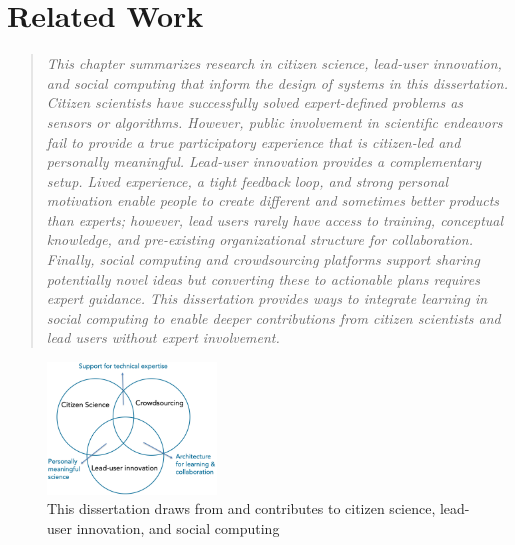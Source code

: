 \chapter{Related Work}
\begin{quote}
\emph{This chapter summarizes research in citizen science, lead-user innovation, and social computing that inform the design of systems in this dissertation. Citizen scientists have successfully solved expert-defined problems as sensors or algorithms. However, public involvement in scientific endeavors fail to provide a true participatory experience that is citizen-led and personally meaningful. Lead-user innovation provides a complementary setup. Lived experience, a tight feedback loop, and strong personal motivation enable people to create different and sometimes better products than experts; however, lead users rarely have access to training, conceptual knowledge, and pre-existing organizational structure for collaboration. Finally, social computing and crowdsourcing platforms support sharing potentially novel ideas but converting these to actionable plans requires expert guidance. This dissertation provides ways to integrate learning in social computing to enable deeper contributions from citizen scientists and lead users without expert involvement.} 
\end{quote}


\begin{figure}[h] 
  \centering
  \includegraphics[width=0.4\textwidth]{figures/2-related/venn.png}
  \caption[]
{This dissertation draws from and contributes to citizen science, lead-user innovation, and social computing}
  \label{fig:related-1}
\end{figure}

\vspace{0.25in}

